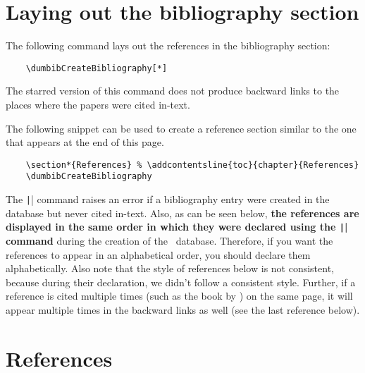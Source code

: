 \documentclass[letter, 12pt]{article}
\begin{document}
  \section{Laying out the bibliography section}
  The following command lays out the references in the bibliography section:
  \begin{verbatim}
    \dumbibCreateBibliography[*]
  \end{verbatim}
  The starred version of this command does not produce backward links to the places where the papers were cited in-text.

  The following snippet can be used to create a reference section similar to the one that appears at the end of this page.

  \begin{verbatim}
    \section*{References} % \addcontentsline{toc}{chapter}{References}
    \dumbibCreateBibliography
  \end{verbatim}

  The \texttt|\dumbibCreateBibliography| command raises an error if a bibliography entry were created in the database but never cited in-text. Also, as can be seen below, \textbf{the references are displayed in the same order in which they were declared using the \texttt|\dumbibReferenceEntry{}| command} during the creation of the \dumbib\ database. Therefore, if you want the references to appear in an alphabetical order, you should declare them alphabetically. Also note that the style of references below is not consistent, because during their declaration, we didn't follow a consistent style. Further, if a reference is cited multiple times (such as the book by \cite*{talagrand2022}) on the same page, it will appear multiple times in the backward links as well (see the last reference below).

  \section*{References}
  \dumbibCreateBibliography
\end{document}
